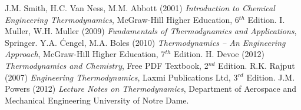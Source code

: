 \documentclass[11pt,oneside,a4paper]{article}
\begin{document}
\begin{thebibliography}{1}
%
 J.M. Smith, H.C. Van Ness, M.M. Abbott (2001) {\it Introduction to Chemical Engineering Thermodynamics}, McGraw-Hill Higher Education, 6$^{th}$ Edition.
%
 I. Muller, W.H. Muller (2009) {\it Fundamentals of Thermodynamics and Applications}, Springer.
%
 Y.A. \'Cengel, M.A. Boles (2010) {\it Thermodynamics -- An Engineering Approach}, McGraw-Hill Higher Education, 7$^{th}$ Edition.
%
 H. Devoe (2012) {\it Thermodynamics and Chemistry}, Free PDF Textbook, 2$^{nd}$ Edition.
%
 R.K. Rajput (2007) {\it Engineering Thermodynamics}, Laxmi Publications Ltd, 3$^{rd}$ Edition.
%
 J.M. Powers (2012) {\it Lecture Notes on Thermodynamics}, Department of Aerospace and Mechanical Engineering University of Notre Dame.
%
\end{thebibliography}
\end{document}
